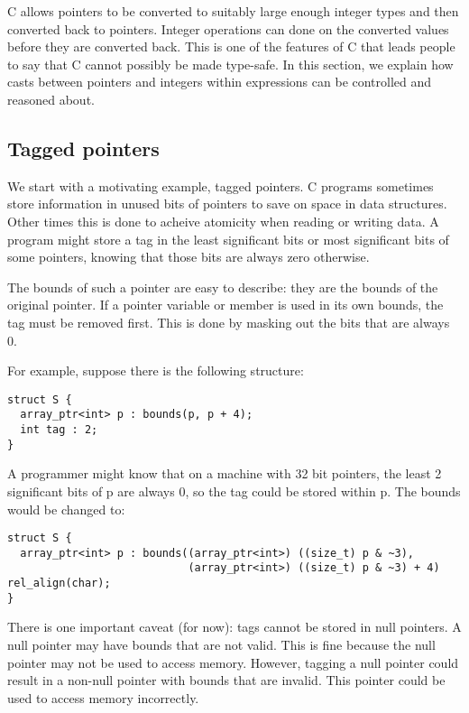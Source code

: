 C allows pointers to be converted to suitably large enough integer
types and then converted back to pointers.  Integer operations can
done on the converted values before they are converted back.
This is one of the features of C that leads people to 
say that C cannot possibly be made type-safe.  In this section,
we explain how casts between pointers and integers within 
expressions can be controlled and reasoned about.

\subsection{Tagged pointers}
We start with a motivating example, tagged pointers.
C programs sometimes store information in unused bits of pointers
to save on space in data structures.  Other times this is done
to acheive atomicity when reading or writing data.  A
program might store a tag in the least significant bits or most
significant bits of some pointers, knowing that those bits are always
zero otherwise.

The bounds of such a pointer are easy to describe: they are the bounds
of the original pointer. If a pointer variable or member is used in its
own bounds, the tag must be removed first. This is
done by masking out the bits that are always 0.

For example, suppose there is the following structure:

\begin{lstlisting}
struct S {
  array_ptr<int> p : bounds(p, p + 4);
  int tag : 2;
}
\end{lstlisting}

A programmer might know that on a machine with 32 bit pointers, the
least 2 significant bits of p are always 0, so the tag could be stored
within p. The bounds would be changed to:

\begin{lstlisting}
struct S {
  array_ptr<int> p : bounds((array_ptr<int>) ((size_t) p & ~3), 
                            (array_ptr<int>) ((size_t) p & ~3) + 4) rel_align(char);
}
\end{lstlisting}

There is one important caveat (for now): tags cannot be stored in null pointers. A
null pointer may have bounds that are not valid. This is fine because
the null pointer may not be used to access memory. However, tagging a
null pointer could result in a non-null pointer with bounds that are
invalid. This pointer could be used to access memory incorrectly.

